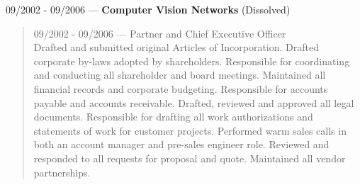 09/2002 - 09/2006 --- {\bf Computer Vision Networks} (Dissolved)
\begin{quote}
09/2002 - 09/2006 --- Partner and Chief Executive Officer\\
Drafted and submitted original Articles of Incorporation. Drafted corporate by-laws adopted by shareholders. Responsible for coordinating and conducting all shareholder and board meetings. Maintained all financial records and corporate budgeting. Responsible for accounts payable and accounts receivable. Drafted, reviewed and approved all legal documents. Responsible for drafting all work authorizations and statements of work for customer projects. Performed warm sales calls in both an account manager and pre-sales engineer role. Reviewed and responded to all requests for proposal and quote. Maintained all vendor partnerships.
\end{quote}

